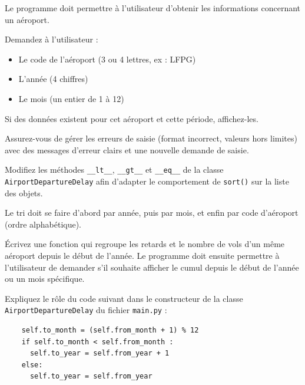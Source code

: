 \documentclass[12pt, a4paper]{exam}
\begin{document}
\begin{questions}
  \vspace{0.6\baselineskip}

  Le programme doit permettre à l'utilisateur d'obtenir les informations concernant un aéroport.

  Demandez à l'utilisateur :
  \begin{itemize}
    \item Le code de l'aéroport (3 ou 4 lettres, ex : LFPG)
    \item L'année (4 chiffres)
    \item Le mois (un entier de 1 à 12)
  \end{itemize}

  Si des données existent pour cet aéroport et cette période, affichez-les.

  Assurez-vous de gérer les erreurs de saisie (format incorrect, valeurs hors
  limites) avec des messages d'erreur clairs et une nouvelle demande de saisie.

  \vspace{0.6\baselineskip}

  Modifiez les méthodes \texttt{\_\_lt\_\_}, \texttt{\_\_gt\_\_} et
  \texttt{\_\_eq\_\_} de la classe \texttt{AirportDepartureDelay} afin d'adapter
  le comportement de \texttt{sort()} sur la liste des objets.

  Le tri doit se faire d'abord par année, puis par mois, et enfin par code d'aéroport (ordre alphabétique).

  \vspace{0.6\baselineskip}

  Écrivez une fonction qui regroupe les retards et le nombre de vols d'un même aéroport
  depuis le début de l'année. Le programme doit ensuite permettre à l'utilisateur de
  demander s'il souhaite afficher le cumul depuis le début de l'année ou un mois spécifique.

  \vspace{0.6\baselineskip}

  Expliquez le rôle du code suivant dans le constructeur de la classe
  \texttt{AirportDepartureDelay} du fichier \texttt{main.py} :
  \begin{verbatim}
    self.to_month = (self.from_month + 1) % 12
    if self.to_month < self.from_month :
      self.to_year = self.from_year + 1
    else:
      self.to_year = self.from_year
  \end{verbatim}

\end{questions}
\end{document}
